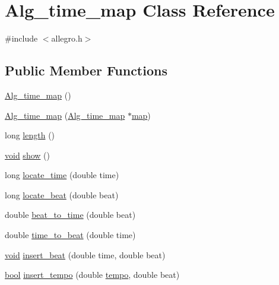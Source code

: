 \hypertarget{class_alg__time__map}{}\section{Alg\+\_\+time\+\_\+map Class Reference}
\label{class_alg__time__map}


{\ttfamily \#include $<$allegro.\+h$>$}

\subsection*{Public Member Functions}
\begin{DoxyCompactItemize}
\item 
\hyperlink{class_alg__time__map_a230334b65edc51d1c9c71f3974cbc5e5}{Alg\+\_\+time\+\_\+map} ()
\item 
\hyperlink{class_alg__time__map_a84f6d7b42cee8843cfd2d785034b746a}{Alg\+\_\+time\+\_\+map} (\hyperlink{class_alg__time__map}{Alg\+\_\+time\+\_\+map} $\ast$\hyperlink{structmap}{map})
\item 
long \hyperlink{class_alg__time__map_aa683d3482ccaef8843015c03d8cf380e}{length} ()
\item 
\hyperlink{sound_8c_ae35f5844602719cf66324f4de2a658b3}{void} \hyperlink{class_alg__time__map_a85af38079e1b8655fdc06a357ea24c0c}{show} ()
\item 
long \hyperlink{class_alg__time__map_a08e9ec92df16f927f0f642a95fd37710}{locate\+\_\+time} (double time)
\item 
long \hyperlink{class_alg__time__map_a240933ae43e9c4aad1bba0700354ec95}{locate\+\_\+beat} (double beat)
\item 
double \hyperlink{class_alg__time__map_a5ccd6dafb60bf532667ac449fe75e3a3}{beat\+\_\+to\+\_\+time} (double beat)
\item 
double \hyperlink{class_alg__time__map_a675b973048797ac487602e5d62987374}{time\+\_\+to\+\_\+beat} (double time)
\item 
\hyperlink{sound_8c_ae35f5844602719cf66324f4de2a658b3}{void} \hyperlink{class_alg__time__map_ae5b26dbf0f85f6e1d6a0fb5ab2fc1cab}{insert\+\_\+beat} (double time, double beat)
\item 
\hyperlink{mac_2config_2i386_2lib-src_2libsoxr_2soxr-config_8h_abb452686968e48b67397da5f97445f5b}{bool} \hyperlink{class_alg__time__map_a37fa82e381243c3751c19530560a4c6c}{insert\+\_\+tempo} (double \hyperlink{midiclock_8c_a15448d4a27a20e04e8ba36b18593f069}{tempo}, double beat)
\item 

\end{DoxyCompactItemize}
